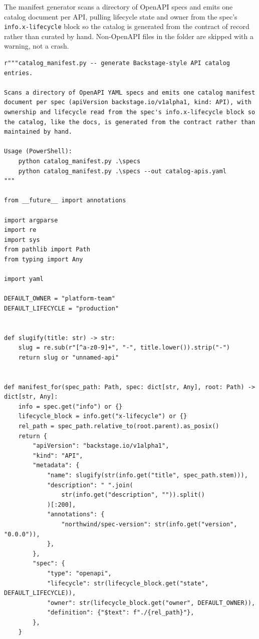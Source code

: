 The manifest generator scans a directory of OpenAPI specs and emits one
catalog document per API, pulling lifecycle state and owner from the
spec's \texttt{info.x-lifecycle} block so the catalog is generated from
the contract of record rather than curated by hand. Non-OpenAPI files in
the folder are skipped with a warning, not a crash.

\begin{verbatim}
r"""catalog_manifest.py -- generate Backstage-style API catalog entries.

Scans a directory of OpenAPI YAML specs and emits one catalog manifest
document per spec (apiVersion backstage.io/v1alpha1, kind: API), with
ownership and lifecycle read from the spec's info.x-lifecycle block so
the catalog, like the docs, is generated from the contract rather than
maintained by hand.

Usage (PowerShell):
    python catalog_manifest.py .\specs
    python catalog_manifest.py .\specs --out catalog-apis.yaml
"""

from __future__ import annotations

import argparse
import re
import sys
from pathlib import Path
from typing import Any

import yaml

DEFAULT_OWNER = "platform-team"
DEFAULT_LIFECYCLE = "production"


def slugify(title: str) -> str:
    slug = re.sub(r"[^a-z0-9]+", "-", title.lower()).strip("-")
    return slug or "unnamed-api"


def manifest_for(spec_path: Path, spec: dict[str, Any], root: Path) -> dict[str, Any]:
    info = spec.get("info") or {}
    lifecycle_block = info.get("x-lifecycle") or {}
    rel_path = spec_path.relative_to(root.parent).as_posix()
    return {
        "apiVersion": "backstage.io/v1alpha1",
        "kind": "API",
        "metadata": {
            "name": slugify(str(info.get("title", spec_path.stem))),
            "description": " ".join(
                str(info.get("description", "")).split()
            )[:200],
            "annotations": {
                "northwind/spec-version": str(info.get("version", "0.0.0")),
            },
        },
        "spec": {
            "type": "openapi",
            "lifecycle": str(lifecycle_block.get("state", DEFAULT_LIFECYCLE)),
            "owner": str(lifecycle_block.get("owner", DEFAULT_OWNER)),
            "definition": {"$text": f"./{rel_path}"},
        },
    }



\end{verbatim}
